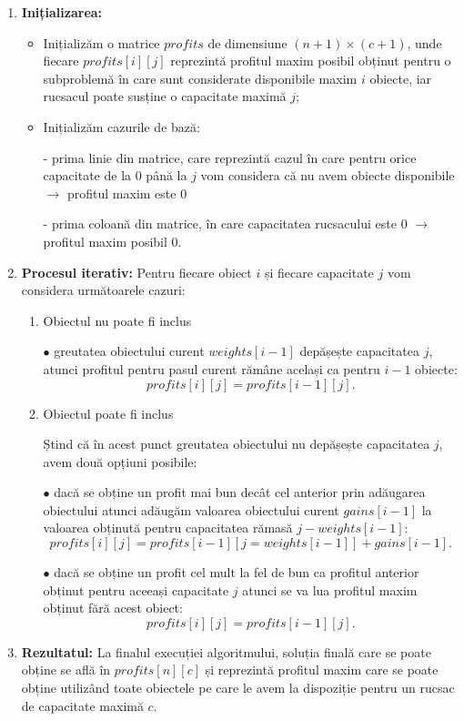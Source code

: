 \begin{sloppypar}
\begin{tcolorbox}[mystyle]
\begin{enumerate}[left=0.2em]
    \item \textbf{Inițializarea:}
    \begin{itemize}
        \item Inițializăm o matrice \(profits\) de dimensiune \((n + 1) \times (c + 1)\), unde fiecare \( profits[i][j]\) reprezintă profitul maxim posibil obținut pentru o subproblemă în care sunt considerate disponibile maxim \(i\) obiecte, iar rucsacul poate susține o capacitate maximă \(j\);
        \item Inițializăm cazurile de bază:
        \par - prima linie din matrice, care reprezintă cazul în care pentru orice capacitate de la 0 până la \(j\) vom considera că nu avem obiecte disponibile $\rightarrow$ profitul maxim este 0
        \par - prima coloană din matrice, în care capacitatea rucsacului este 0 $\rightarrow$ profitul maxim posibil 0.
    \end{itemize}
    \item \textbf{Procesul iterativ:}
    Pentru fiecare obiect \(i\) și fiecare capacitate \(j\) vom considera următoarele cazuri:
    \begin{enumerate}
        \item Obiectul nu poate fi inclus \par
            $\bullet$ greutatea obiectului curent \(weights[i - 1]\) depășește capacitatea \(j\), atunci profitul pentru pasul curent rămâne același ca pentru \(i - 1\) obiecte: \[profits[i][j] = profits[i - 1][j].\]
        \item Obiectul poate fi inclus \par
        Ștind că în acest punct greutatea obiectului nu depășește capacitatea \(j\), avem două opțiuni posibile: \par
        $\bullet$ dacă se obține un profit mai bun decât cel anterior prin adăugarea obiectului atunci adăugăm valoarea obiectului curent \(gains[i - 1]\) la valoarea obținută pentru capacitatea rămasă \(j - weights[i - 1]\): \[profits[i][j] = profits[i - 1][j = weights[i - 1]] + gains[i - 1].\] \par
        $\bullet$ dacă se obține un profit cel mult la fel de bun ca profitul anterior obținut pentru aceeași capacitate \(j\) atunci se va lua profitul maxim obținut fără acest obiect: \[profits[i][j] = profits[i - 1][j].\] 
    \end{enumerate}
    \item \textbf{Rezultatul:}
    La finalul execuției algoritmului, soluția finală care se poate obține se află în \(profits[n][c]\) și reprezintă profitul maxim care se poate obține utilizând toate obiectele pe care le avem la dispoziție pentru un rucsac de capacitate maximă \(c\).
\end{enumerate}
\end{tcolorbox}


\end{sloppypar}
